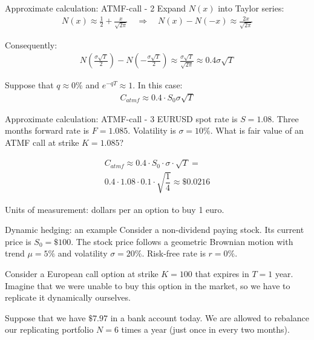 \documentclass{beamer}
\begin{document}
\begin{frame}{Approximate calculation: ATMF-call - 2}
\justify
Expand $N(x)$ into Taylor series:
\begin{align*}
N(x) \approx \frac{1}{2} + \frac{x}{\sqrt{2\pi}} \quad \Rightarrow \quad
N(x) - N(-x) \approx \frac{2x}{\sqrt{2\pi}}
\end{align*}

Consequently:
\begin{align*}
N\left(\frac{\sigma \sqrt{T}}{2}\right) - N\left(-\frac{\sigma \sqrt{T}}{2}\right)
\approx
\frac{\sigma\sqrt{T}}{\sqrt{2\pi}}
\approx
0.4\sigma\sqrt{T}
\end{align*}

Suppose that $q\approx 0\%$ and $e^{-qT} \approx 1$. In this case:
\begin{align*}
C_{atmf} \approx 0.4 \cdot S_0 \sigma \sqrt{T}
\end{align*}
\end{frame}



\begin{frame}{Approximate calculation: ATMF-call - 3}
\justify
EURUSD spot rate is $S=1.08$. Three months forward rate is $F=1.085$. Volatility is $\sigma=10\%$. What is fair value of an ATMF call at strike $K=1.085$?

\begin{align*}
C_{atmf} \approx 0.4 \cdot S_0 \cdot \sigma \cdot \sqrt{T} = \\
0.4 \cdot 1.08 \cdot 0.1 \cdot \sqrt{\dfrac{1}{4}} \approx \$0.0216
\end{align*}

Units of measurement: dollars per an option to buy 1 euro.
\end{frame}



\begin{frame}{Dynamic hedging: an example}
\justify
Consider a non-dividend paying stock. Its current price is $S_0=\$100$. The stock price follows a geometric Brownian motion with trend $\mu=5\%$ and volatility $\sigma=20\%$. Risk-free rate is $r=0\%$.

\justify
Consider a European call option at strike $K=100$ that expires in $T=1$ year. Imagine that we were unable to buy this option in the market, so we have to replicate it dynamically ourselves.

\justify
Suppose that we have $\$7.97$ in  a bank account today. We are allowed to rebalance our replicating portfolio $N=6$ times a year (just once in every two months).
\end{frame}
\end{document}
